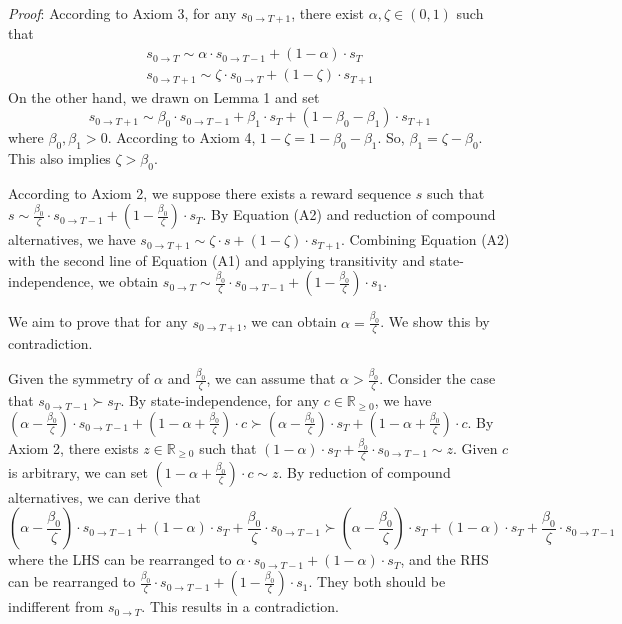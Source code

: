 \documentclass[
  12pt,
]{article}
\begin{document}
\noindent \emph{Proof}: According to Axiom 3, for any
\(s_{0\rightarrow T+1}\), there exist \(\alpha,\zeta \in (0,1)\) such
that\[\tag{A1}
\begin{aligned}
s_{0 \rightarrow T}\sim\alpha\cdot s_{0 \rightarrow T-1} + (1-\alpha)\cdot s_T \\
s_{0\rightarrow T+1} \sim \zeta\cdot s_{0\rightarrow T} + (1-\zeta)\cdot s_{T+1}
\end{aligned}
\]On the other hand, we drawn on Lemma 1 and set\[\tag{A2}
s_{0\rightarrow T+1} \sim \beta_0\cdot s_{0 \rightarrow T-1} + \beta_1\cdot s_T + (1-\beta_0-\beta_1)\cdot s_{T+1}
\]where \(\beta_0, \beta_1 > 0\). According to Axiom 4,
\(1-\zeta=1-\beta_0-\beta_1\). So, \(\beta_1=\zeta-\beta_0\). This also
implies \(\zeta > \beta_0\).

According to Axiom 2, we suppose there exists a reward sequence \(s\)
such that
\(s \sim \frac{\beta_0}{\zeta}\cdot s_{0 \rightarrow T-1} + (1-\frac{\beta_0}{\zeta})\cdot s_T\).
By Equation (A2) and reduction of compound alternatives, we have
\(s_{0\rightarrow T+1}\sim \zeta \cdot s + (1-\zeta)\cdot s_{T+1}\).
Combining Equation (A2) with the second line of Equation (A1) and
applying transitivity and state-independence, we obtain
\(s_{0\rightarrow T} \sim \frac{\beta_0}{\zeta}\cdot s_{0 \rightarrow T-1} + (1-\frac{\beta_0}{\zeta})\cdot s_1\).

We aim to prove that for any \(s_{0\rightarrow T+1}\), we can obtain
\(\alpha=\frac{\beta_0}{\zeta}\). We show this by contradiction.

Given the symmetry of \(\alpha\) and \(\frac{\beta_0}{\zeta}\), we can
assume that \(\alpha > \frac{\beta_0}{\zeta}\). Consider the case that
\(s_{0 \rightarrow T-1} \succ s_T\). By state-independence, for any
\(c\in \mathbb{R}_{\geq 0}\), we have
\((\alpha - \frac{\beta_0}{\zeta})\cdot s_{0\rightarrow T-1} + (1-\alpha+\frac{\beta_0}{\zeta})\cdot c \succ (\alpha - \frac{\beta_0}{\zeta})\cdot s_T + (1-\alpha+\frac{\beta_0}{\zeta})\cdot c\).
By Axiom 2, there exists \(z\in \mathbb{R}_{\geq 0}\) such that
\((1-\alpha)\cdot s_T + \frac{\beta_0}{\zeta}\cdot s_{0\rightarrow T-1}\sim z\).
Given \(c\) is arbitrary, we can set
\((1-\alpha+\frac{\beta_0}{\zeta})\cdot c \sim z\). By reduction of
compound alternatives, we can derive that\[
(\alpha-\frac{\beta_0}{\zeta})\cdot s_{0\rightarrow T-1} +(1-\alpha)\cdot s_T + \frac{\beta_0}{\zeta}\cdot s_{0\rightarrow T-1} \succ (\alpha-\frac{\beta_0}{\zeta})\cdot s_T +(1-\alpha)\cdot s_T + \frac{\beta_0}{\zeta}\cdot s_{0\rightarrow T-1}
\]where the LHS can be rearranged to
\(\alpha\cdot s_{0\rightarrow T-1} + (1-\alpha)\cdot s_T\), and the RHS
can be rearranged to
\(\frac{\beta_0}{\zeta}\cdot s_{0 \rightarrow T-1} + (1-\frac{\beta_0}{\zeta})\cdot s_1\).
They both should be indifferent from \(s_{0\rightarrow T}\). This
results in a contradiction.
\end{document}
